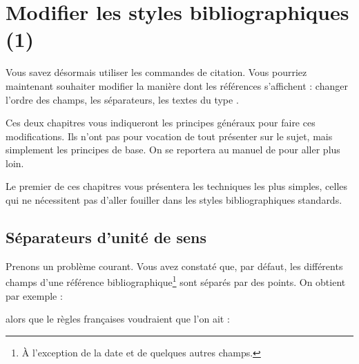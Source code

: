 \chapter{Modifier les styles bibliographiques (1)}\label{style1}

    \begin{intro}
    
    Vous savez désormais utiliser les commandes de citation. Vous pourriez maintenant souhaiter modifier la manière dont les références s'affichent :  changer l'ordre des champs, les séparateurs, les textes du type .
    
    Ces deux chapitres vous indiqueront les principes généraux pour faire ces modifications. Ils n'ont pas pour vocation de tout présenter sur le sujet, mais simplement les principes de base. On se reportera au manuel de  pour aller plus loin.
    
    Le premier de ces chapitres vous présentera les techniques les plus simples, celles qui ne nécessitent pas d'aller fouiller dans les styles bibliographiques standards. 
    
    
    \end{intro}
    
    
\section{Séparateurs d'unité de sens}\label{unitebiblio}
    
Prenons un problème courant. Vous avez constaté que, par défaut, les différents champs d'une référence bibliographique\footnote{À l'exception de la date et de quelques autres champs.} sont séparés par des points. On obtient par exemple :
    
    \bibverbose

    
    \renewcommand{\newunitpunct}[0]{\adddot\addspace} %
    
    \begin{quotation}
    \cite{Urner1952}
    \end{quotation}
    
alors que le règles françaises voudraient que l'on ait :
    
\renewcommand{\newunitpunct}[0]{\addcomma\addspace} %
    
    \begin{quotation}
    \cite{Urner1952}
    \end{quotation}
    
    \bibverbosetrad

